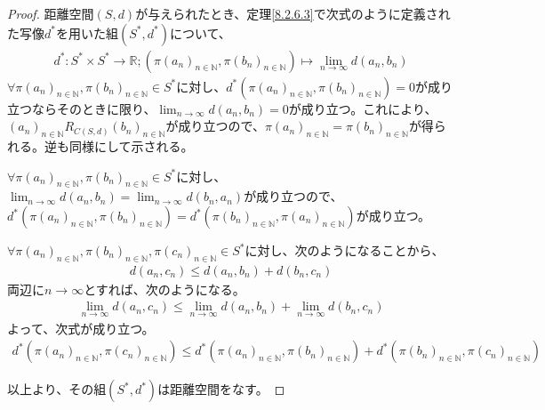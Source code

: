 \documentclass[dvipdfmx]{jsarticle}
\begin{document}
\begin{proof}
距離空間$(S,d)$が与えられたとき、定理\ref{8.2.6.3}で次式のように定義された写像$d^{*}$を用いた組$\left( S^{*},d^{*} \right)$について、
\begin{align*}
d^{*}:S^{*} \times S^{*} \rightarrow \mathbb{R};\left( \pi\left( a_{n} \right)_{n \in \mathbb{N}},\pi\left( b_{n} \right)_{n \in \mathbb{N}} \right) \mapsto \lim_{n \rightarrow \infty}{d\left( a_{n},b_{n} \right)}
\end{align*}
$\forall\pi\left( a_{n} \right)_{n \in \mathbb{N}},\pi\left( b_{n} \right)_{n \in \mathbb{N}} \in S^{*}$に対し、$d^{*}\left( \pi\left( a_{n} \right)_{n \in \mathbb{N}},\pi\left( b_{n} \right)_{n \in \mathbb{N}} \right) = 0$が成り立つならそのときに限り、$\lim_{n \rightarrow \infty}{d\left( a_{n},b_{n} \right)} = 0$が成り立つ。これにより、$\left( a_{n} \right)_{n \in \mathbb{N}}R_{C(S,d)}\left( b_{n} \right)_{n \in \mathbb{N}}$が成り立つので、$\pi\left( a_{n} \right)_{n \in \mathbb{N}} = \pi\left( b_{n} \right)_{n \in \mathbb{N}}$が得られる。逆も同様にして示される。\par
$\forall\pi\left( a_{n} \right)_{n \in \mathbb{N}},\pi\left( b_{n} \right)_{n \in \mathbb{N}} \in S^{*}$に対し、$\lim_{n \rightarrow \infty}{d\left( a_{n},b_{n} \right)} = \lim_{n \rightarrow \infty}{d\left( b_{n},a_{n} \right)}$が成り立つので、$d^{*}\left( \pi\left( a_{n} \right)_{n \in \mathbb{N}},\pi\left( b_{n} \right)_{n \in \mathbb{N}} \right) = d^{*}\left( \pi\left( b_{n} \right)_{n \in \mathbb{N}},\pi\left( a_{n} \right)_{n \in \mathbb{N}} \right)$が成り立つ。\par
$\forall\pi\left( a_{n} \right)_{n \in \mathbb{N}},\pi\left( b_{n} \right)_{n \in \mathbb{N}},\pi\left( c_{n} \right)_{n \in \mathbb{N}} \in S^{*}$に対し、次のようになることから、
\begin{align*}
d\left( a_{n},c_{n} \right) \leq d\left( a_{n},b_{n} \right) + d\left( b_{n},c_{n} \right)
\end{align*}
両辺に$n \rightarrow \infty$とすれば、次のようになる。
\begin{align*}
\lim_{n \rightarrow \infty}{d\left( a_{n},c_{n} \right)} \leq \lim_{n \rightarrow \infty}{d\left( a_{n},b_{n} \right)} + \lim_{n \rightarrow \infty}{d\left( b_{n},c_{n} \right)}
\end{align*}
よって、次式が成り立つ。
\begin{align*}
d^{*}\left( \pi\left( a_{n} \right)_{n \in \mathbb{N}},\pi\left( c_{n} \right)_{n \in \mathbb{N}} \right) \leq d^{*}\left( \pi\left( a_{n} \right)_{n \in \mathbb{N}},\pi\left( b_{n} \right)_{n \in \mathbb{N}} \right) + d^{*}\left( \pi\left( b_{n} \right)_{n \in \mathbb{N}},\pi\left( c_{n} \right)_{n \in \mathbb{N}} \right)
\end{align*}\par
以上より、その組$\left( S^{*},d^{*} \right)$は距離空間をなす。
\end{proof}
\end{document}
